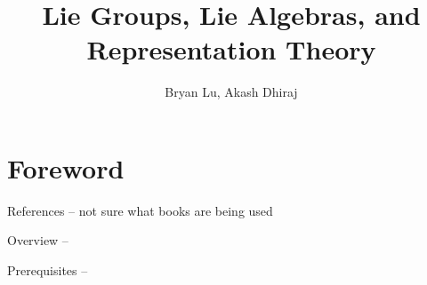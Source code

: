 \documentclass[12pt, nodate]{scrartcl}
\title{Lie Groups, Lie Algebras, and Representation Theory}
\author{Bryan Lu, Akash Dhiraj}
\begin{document}
\maketitle

\setcounter{section}{-1}
\section{Foreword}
References -- not sure what books are being used

Overview --

Prerequisites --

\pagebreak


\end{document}
